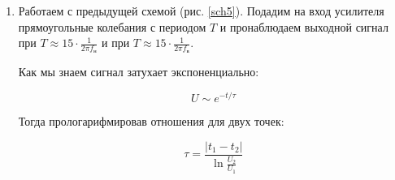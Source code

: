 \documentclass[a4paper]{article}
\begin{document}
\begin{enumerate}
    \item Работаем с предыдущей схемой (рис. \ref{sch5}). Подадим на вход усилителя прямоугольные колебания с периодом $T$ и пронаблюдаем выходной сигнал при $T \approx 15 \cdot \frac{1}{2 \pi f_н}$ и при $T \approx 15 \cdot \frac{1}{2 \pi f_в}$.

        Как мы знаем сигнал затухает экспоненциально:

        \begin{equation}
            U \sim e^{-t/\tau}
        \end{equation}

        Тогда прологарифмировав отношения для двух точек:

        \begin{equation}
            \tau = \frac{|t_1 - t_2|}{\ln{\frac{U_2}{U_1}}}
            \label{tau}
        \end{equation}


\end{enumerate}
\end{document}
